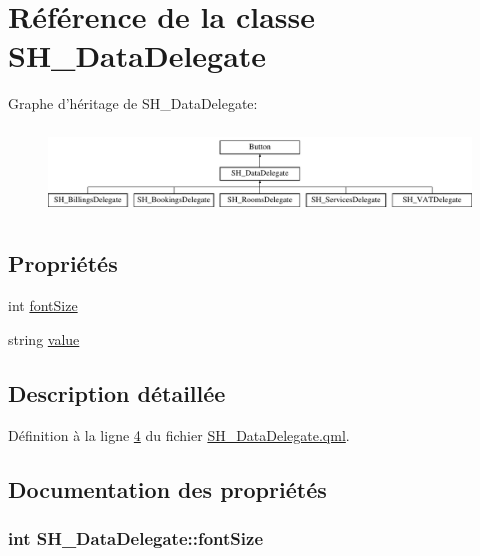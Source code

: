 \hypertarget{classSH__DataDelegate}{\section{Référence de la classe S\-H\-\_\-\-Data\-Delegate}
\label{classSH__DataDelegate}
}
Graphe d'héritage de S\-H\-\_\-\-Data\-Delegate\-:\begin{figure}[H]
\begin{center}
\leavevmode
\includegraphics[height=2.317241cm]{classSH__DataDelegate}
\end{center}
\end{figure}
\subsection*{Propriétés}
\begin{DoxyCompactItemize}
\item 
int \hyperlink{classSH__DataDelegate_afbb41ad9b513c7f27e7b5ad90d82e95b}{font\-Size}
\item 
string \hyperlink{classSH__DataDelegate_acb9da3c73493c88865e08d9575f26482}{value}
\end{DoxyCompactItemize}


\subsection{Description détaillée}


Définition à la ligne \hyperlink{SH__DataDelegate_8qml_source_l00004}{4} du fichier \hyperlink{SH__DataDelegate_8qml_source}{S\-H\-\_\-\-Data\-Delegate.\-qml}.



\subsection{Documentation des propriétés}
\hypertarget{classSH__DataDelegate_afbb41ad9b513c7f27e7b5ad90d82e95b}{
\subsubsection[{font\-Size}]{\setlength{\rightskip}{0pt plus 5cm}int S\-H\-\_\-\-Data\-Delegate\-::font\-Size}}\label{classSH__DataDelegate_afbb41ad9b513c7f27e7b5ad90d82e95b}


